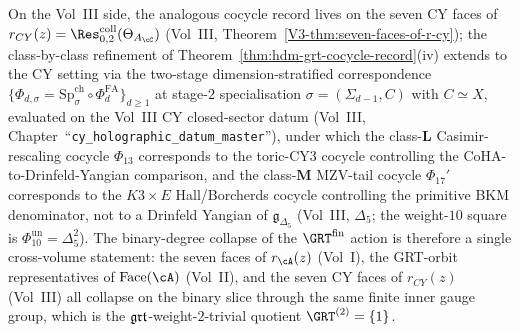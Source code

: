 \begin{remark}
\label{rem:hdm-grt-cocycle-xvol}
On the Vol~III side, the analogous cocycle record lives on the
seven CY faces of $r_{CY}(z) = \Res^{\mathrm{coll}}_{0,2}
(\Theta_{A_\cC})$ \textup{(}Vol~III,
Theorem~\textup{\ref{V3-thm:seven-faces-of-r-cy}}\textup{)}; the
class-by-class refinement of
Theorem~\ref{thm:hdm-grt-cocycle-record}(iv) extends to the CY
setting via the two-stage dimension-stratified correspondence
$\{\Phi_{d,\sigma}=\mathrm{Sp}^{\mathrm{ch}}_{\sigma}\circ
\Phi^{\mathrm{FA}}_d\}_{d\geq 1}$ at stage-$2$ specialisation
$\sigma=(\Sigma_{d-1},C)$ with $C\simeq X$, evaluated on the
Vol~III CY closed-sector datum
\textup{(}Vol~III, Chapter~``\texttt{cy\_holographic\_datum\_master}''\textup{)},
under which the class-$\mathbf{L}$ Casimir-rescaling cocycle
$\Phi_{13}$ corresponds to the toric-CY3 cocycle controlling the
CoHA-to-Drinfeld-Yangian comparison, and the class-$\mathbf{M}$ MZV-tail
cocycle $\Phi_{17}'$ corresponds to the $K3\times E$
Hall/Borcherds cocycle controlling the primitive BKM denominator, not
to a Drinfeld Yangian of $\mathfrak g_{\Delta_5}$
\textup{(}Vol~III, $\Delta_5$; the weight-$10$ square is
$\Phi_{10}^{\mathrm{un}}=\Delta_5^2$\textup{)}. The
binary-degree collapse of the $\GRT^{\mathrm{fin}}$ action is
therefore a single cross-volume statement: the seven faces of
$r_\cA(z)$ (Vol~I), the GRT-orbit representatives of $\Face(\cA)$
(Vol~II), and the seven CY faces of $r_{CY}(z)$ (Vol~III) all
collapse on the binary slice through the same finite inner gauge
group, which is the $\mathfrak{grt}$-weight-$2$-trivial quotient
$\GRT^{(2)}=\{1\}$.
\end{remark}

